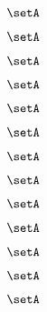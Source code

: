 \begin{forslides}
    \begin{equation}
        \label{eq:slides-translation-26}
        \setA
    \end{equation}

    \begin{equation}
        \label{eq:slides-translation-27}
        \setA
    \end{equation}

    \begin{equation}
        \label{eq:slides-translation-28}
        \setA
    \end{equation}

    \begin{equation}
        \label{eq:slides-translation-29}
        \setA
    \end{equation}
    
    \begin{equation}
        \label{eq:slides-translation-30}
        \setA
    \end{equation}

    \begin{equation}
        \label{eq:slides-translation-31}
        \setA
    \end{equation}

    \begin{equation}
        \label{eq:slides-translation-32}
        \setA
    \end{equation}

    \begin{equation}
        \label{eq:slides-translation-33}
        \setA
    \end{equation}

    \begin{equation}
        \label{eq:slides-translation-34}
        \setA
    \end{equation}

    \begin{equation}
        \label{eq:slides-translation-35}
        \setA
    \end{equation}

    \begin{equation}
        \label{eq:slides-translation-36}
        \setA
    \end{equation}

    \begin{equation}
        \label{eq:slides-translation-37}
        \setA
    \end{equation}

    \begin{equation}
        \label{eq:slides-translation-38}
        \setA
    \end{equation}


\end{forslides}
